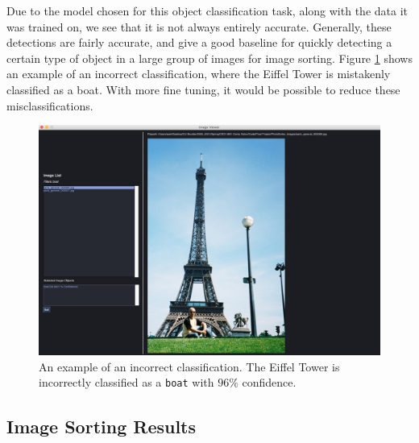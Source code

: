 \documentclass[12pt]{article}
\begin{document}
Due to the model chosen for this object classification task, along with the data it was trained on, we see that it is not always entirely accurate. Generally, these detections are fairly accurate, and give a good baseline for quickly detecting a certain type of object in a large group of images for image sorting. Figure \ref{fig:incorrect_classification} shows an example of an incorrect classification, where the Eiffel Tower is mistakenly classified as a boat. With more fine tuning, it would be possible to reduce these misclassifications.
\begin{figure}[H]
	\centering
	\includegraphics[width=.9\textwidth]{images/incorrect_classification_boat.png}
	\caption{An example of an incorrect classification. The Eiffel Tower is incorrectly classified as a \texttt{boat} with $96\%$ confidence.}
	\label{fig:incorrect_classification}
\end{figure}

\subsection{Image Sorting Results}
\end{document}
